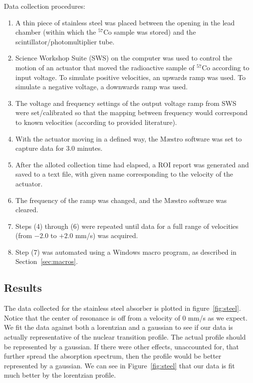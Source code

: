 \documentclass[paper=a4, fontsize=11pt, abstract=on]{scrartcl} %
\numberwithin{equation}{section}
\numberwithin{figure}{section}
\numberwithin{table}{section}
\begin{document}
Data collection procedures:
\begin{enumerate}
\item A thin piece of stainless steel was placed between the opening in the lead chamber (within which the $^{57}$Co sample was stored) and the scintillator/photomultiplier tube.
\item Science Workshop Suite (SWS) on the computer was used to control the motion of an actuator that moved the radioactive sample of $^{57}$Co according to input voltage. To simulate positive velocities, an upwards ramp was used. To simulate a negative voltage, a downwards ramp was used.
\item The voltage and frequency settings of the output voltage ramp from SWS were set/calibrated so that the mapping between frequency would correspond to known velocities (according to provided literature).
\item With the actuator moving in a defined way, the M\ae{}stro software was set to capture data for $3.0$ minutes.
\item After the alloted collection time had elapsed, a ROI report was generated and saved to a text file, with given name corresponding to the velocity of the actuator.
\item The frequency of the ramp was changed, and the M\ae{}stro software was cleared.
\item Steps (4) through (6) were repeated until data for a full range of velocities (from $-2.0$ to $+2.0$ mm/s) was acquired.
\item Step (7) was automated using a Windows macro program, as described in Section~\ref{sec:macros}.
\end{enumerate}

\subsection{Results}
\label{sec:stres}

The data collected for the stainless steel absorber is plotted in
figure~\ref{fig:steel}. Notice that the center of resonance is off
from a velocity of 0 mm/s as we expect. We fit the data against both a lorentzian and
a gaussian to see if our data is actually representative of the
nuclear transition profile. The actual profile should be
represented by a gaussian. If there were other effects, unaccounted
for, that further spread the absorption spectrum, then the profile
would be better represented by a gaussian. We can see in
Figure~\ref{fig:steel} that our data is fit much better by the
lorentzian profile. 
\end{document}

